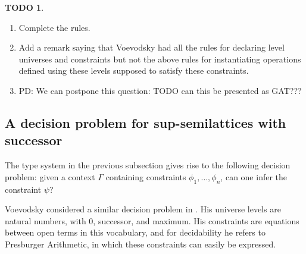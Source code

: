 \documentclass[11pt,a4paper]{article}
\theoremstyle{definition}
\newtheorem{TODO}{TODO}[theorem]
\newcommand{\UU}{\mathsf{U}}
\begin{document}


\begin{TODO}
  \begin{enumerate}
  \item Complete the rules.
  \item Add a remark saying that Voevodsky had all the rules for declaring level universes and
    constraints but not the above rules for instantiating operations defined using these levels
    supposed to satisfy these constraints.

  \item PD: We can postpone this question: TODO   can this be presented as GAT???
   \end{enumerate}
 \end{TODO}

\subsection{A decision problem for sup-semilattices with successor}

The type system in the previous subsection gives rise to the following
decision problem: given a context $\Gamma$ containing constraints $\phi_1,\ldots,\phi_n$,
can one infer the constraint $\psi$?

Voevodsky considered a similar decision problem in \cite[Section 2]{VV}.
His universe levels are natural numbers, with 0, successor, and maximum.
His constraints are equations between open terms in this vocabulary,
and for decidability he refers to Presburger Arithmetic,
in which these constraints can easily be expressed.
\end{document}
